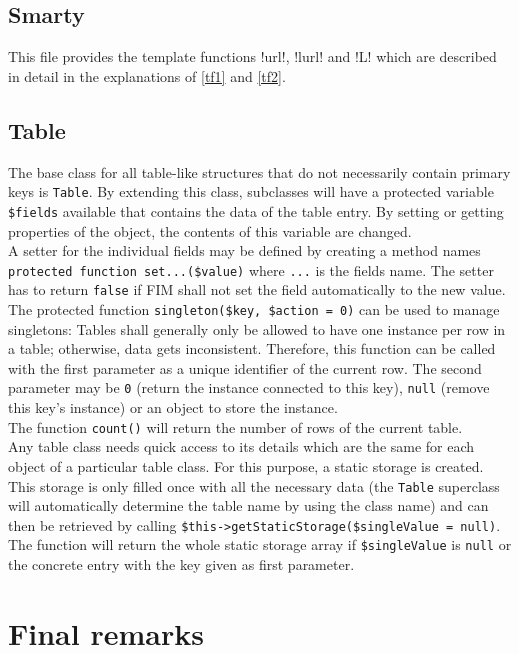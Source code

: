 \documentclass{scrartcl}
\begin{document}
   \subsection{Smarty}
      This file provides the template functions \smarty!{url}!, \smarty!{lurl}! and \smarty!{L}! which are described in detail in the explanations of \autoref{tf1} and \autoref{tf2}.
   \subsection{Table}
      The base class for all table-like structures that do not necessarily contain primary keys is \lstinline!Table!. By extending this class, subclasses will have a protected variable \lstinline!$fields! available that contains the data of the table entry. By setting or getting properties of the object, the contents of this variable are changed. \\
      A setter for the individual fields may be defined by creating a method names \lstinline!protected function set...($value)! where \lstinline!...! is the fields name. The setter has to return \lstinline!false! if FIM shall not set the field automatically to the new value. \\
      The protected function \lstinline!singleton($key, $action = 0)! can be used to manage singletons: Tables shall generally only be allowed to have one instance per row in a table; otherwise, data gets inconsistent. Therefore, this function can be called with the first parameter as a unique identifier of the current row. The second parameter may be \lstinline!0! (return the instance connected to this key), \lstinline!null! (remove this key's instance) or an object to store the instance. \\
      The function \lstinline!count()! will return the number of rows of the current table. \\
      Any table class needs quick access to its details which are the same for each object of a particular table class. For this purpose, a static storage is created. This storage is only filled once with all the necessary data (the \lstinline!Table! superclass will automatically determine the table name by using the class name) and can then be retrieved by calling \lstinline!$this->getStaticStorage($singleValue = null)!. The function will return the whole static storage array if \lstinline!$singleValue! is \lstinline!null! or the concrete entry with the key given as first parameter.
   \section{Final remarks}
\end{document}
